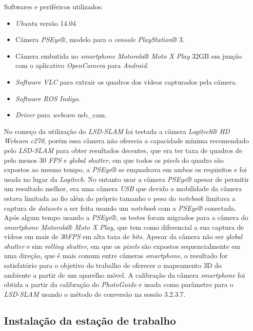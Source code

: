 Softwares e periféricos utilizados:

\begin{itemize}
	\item{\textit{Ubuntu} versão 14.04\cite{Ubuntu}}
	\item{Câmera \textit{PSEye®}, modelo para o \textit{console} \textit{PlayStation®} 3.}
	\item{Câmera embutida no \textit{smartphone Motorola® Moto X Play} 32GB em junção com o aplicativo \textit{OpenCamera} para \textit{Android}.}
	\item{\textit{Software VLC} para extrair os quadros dos vídeos capturados pela câmera.}
	\item{\textit{Software ROS Indigo}.\cite{ROS-Tutorial}}
	\item{\textit{Driver} para \textit{webcam} usb\_cam.\cite{Setup-USBCAM}}
\end{itemize}

No começo da utilização do \textit{LSD-SLAM} foi testada a câmera \textit{Logitech® HD Webcam c270}, porém essa câmera não oferecia a capacidade mínima recomendado pelo \textit{LSD-SLAM} para obter resultados decentes, que era ter taxa de quadros de pelo menos 30 \textit{FPS} e \textit{global shutter}, em que todos os \textit{pixels} do quadro são expostos ao mesmo tempo, a \textit{PSEye®} se enquadrava em ambos os requisitos e foi usada no lugar da \textit{Logitech}. No entanto usar a câmera \textit{PSEye®} apesar de permitir um resultado melhor, era uma câmera \textit{USB} que devido a mobilidade da câmera estava limitada ao fio além do próprio tamanho e peso do \textit{notebook} limitava a captura de \textit{datasets} a ser feita usando um \textit{notebook} com a \textit{PSEye®} conectada. Após algum tempo usando a \textit{PSEye®}, os testes foram migrados para a câmera do \textit{smartphone Motorola® Moto X Play}, que tem como diferencial a sua captura de vídeos em mais de 30\textit{FPS} em alta taxa de \textit{bits}. Apesar da câmera não ser \textit{global shutter} e sim \textit{rolling shutter}, em que os \textit{pixels} são expostos sequencialmente em uma direção, que é mais comum entre câmeras \textit{smartphone}, o resultado for satisfatório para o objetivo do trabalho de oferecer o mapeamento 3D do ambiente a partir de um aparelho móvel. A calibração da câmera \textit{smartphone} foi obtida a partir da calibração do \textit{PhotoGuide} e usada como parâmetro para o \textit{LSD-SLAM} usando o método de conversão na sessão 3.2.3.7.

\subsection{Instalação da estação de trabalho}

